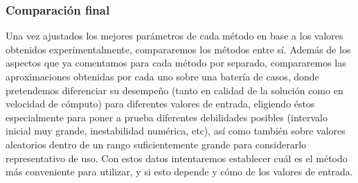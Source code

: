 	\subsubsection{Comparación final}
Una vez ajustados los mejores parámetros de cada método en base a los valores obtenidos experimentalmente, compararemos los métodos entre sí. Además de los aspectos que ya comentamos para cada método por separado, compararemos las aproximaciones obtenidas por cada uno sobre una batería de casos, donde pretendemos diferenciar su desempeño (tanto en calidad de la solución como en velocidad de cómputo) para diferentes valores de entrada, eligiendo éstos especialmente para poner a prueba diferentes debilidades posibles (intervalo inicial muy grande, inestabilidad numérica, etc), así como también sobre valores aleatorios dentro de un rango suficientemente grande para considerarlo representativo de uso. Con estos datos intentaremos establecer cuál es el método más conveniente para utilizar, y si esto depende y cómo de los valores de entrada.


